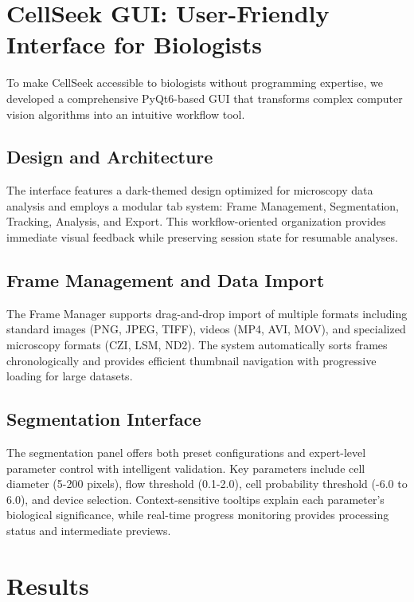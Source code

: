 \documentclass[12pt]{article}
\begin{document}
\section{CellSeek GUI: User-Friendly Interface for Biologists}

To make CellSeek accessible to biologists without programming expertise, we developed a comprehensive PyQt6-based GUI that transforms complex computer vision algorithms into an intuitive workflow tool.

\subsection{Design and Architecture}

The interface features a dark-themed design optimized for microscopy data analysis and employs a modular tab system: Frame Management, Segmentation, Tracking, Analysis, and Export. This workflow-oriented organization provides immediate visual feedback while preserving session state for resumable analyses.

\subsection{Frame Management and Data Import}

The Frame Manager supports drag-and-drop import of multiple formats including standard images (PNG, JPEG, TIFF), videos (MP4, AVI, MOV), and specialized microscopy formats (CZI, LSM, ND2). The system automatically sorts frames chronologically and provides efficient thumbnail navigation with progressive loading for large datasets.

\subsection{Segmentation Interface}

The segmentation panel offers both preset configurations and expert-level parameter control with intelligent validation. Key parameters include cell diameter (5-200 pixels), flow threshold (0.1-2.0), cell probability threshold (-6.0 to 6.0), and device selection. Context-sensitive tooltips explain each parameter's biological significance, while real-time progress monitoring provides processing status and intermediate previews.

\section{Results}
\end{document}
